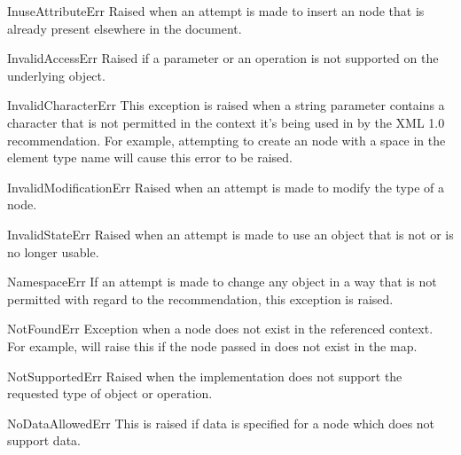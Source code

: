 \begin{excdesc}{InuseAttributeErr}
  Raised when an attempt is made to insert an  node that
  is already present elsewhere in the document.
\end{excdesc}

\begin{excdesc}{InvalidAccessErr}
  Raised if a parameter or an operation is not supported on the
  underlying object.
\end{excdesc}

\begin{excdesc}{InvalidCharacterErr}
  This exception is raised when a string parameter contains a
  character that is not permitted in the context it's being used in by
  the XML 1.0 recommendation.  For example, attempting to create an
   node with a space in the element type name will
  cause this error to be raised.
\end{excdesc}

\begin{excdesc}{InvalidModificationErr}
  Raised when an attempt is made to modify the type of a node.
\end{excdesc}

\begin{excdesc}{InvalidStateErr}
  Raised when an attempt is made to use an object that is not or is no
  longer usable.
\end{excdesc}

\begin{excdesc}{NamespaceErr}
  If an attempt is made to change any object in a way that is not
  permitted with regard to the
  recommendation, this exception is raised.
\end{excdesc}

\begin{excdesc}{NotFoundErr}
  Exception when a node does not exist in the referenced context.  For
  example,  will raise this if
  the node passed in does not exist in the map.
\end{excdesc}

\begin{excdesc}{NotSupportedErr}
  Raised when the implementation does not support the requested type
  of object or operation.
\end{excdesc}

\begin{excdesc}{NoDataAllowedErr}
  This is raised if data is specified for a node which does not
  support data.
\end{excdesc}

